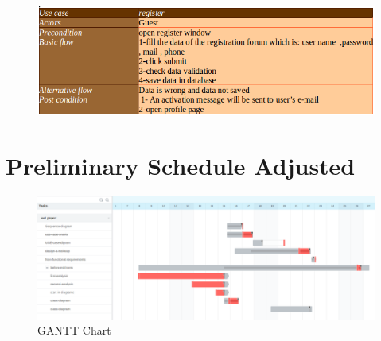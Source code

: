 \documentclass[]{article}
\begin{document}
\begin{figure}[H]
\centering
\includegraphics[scale=0.4]{./scenario/01}
\end{figure}


\section{Preliminary Schedule Adjusted}

\begin{figure}[H]
\centering
\includegraphics[scale=0.3]{./ganttchart}
\caption{GANTT Chart}
\end{figure}




\end{document}
